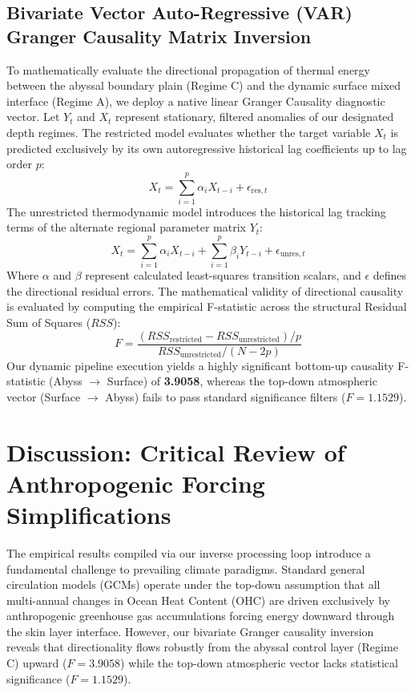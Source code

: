 \documentclass[11pt,a4paper]{article}
\begin{document}
\subsection{Bivariate Vector Auto-Regressive (VAR) Granger Causality Matrix Inversion}
To mathematically evaluate the directional propagation of thermal energy between the abyssal boundary plain (Regime C) and the dynamic surface mixed interface (Regime A), we deploy a native linear Granger Causality diagnostic vector. Let $Y_t$ and $X_t$ represent stationary, filtered anomalies of our designated depth regimes. The restricted model evaluates whether the target variable $X_t$ is predicted exclusively by its own autoregressive historical lag coefficients up to lag order $p$:
\begin{equation}
    X_t = \sum_{i=1}^{p} \alpha_i X_{t-i} + \epsilon_{\text{res},t}
\end{equation}
The unrestricted thermodynamic model introduces the historical lag tracking terms of the alternate regional parameter matrix $Y_t$:
\begin{equation}
    X_t = \sum_{i=1}^{p} \alpha_i X_{t-i} + \sum_{i=1}^{p} \beta_i Y_{t-i} + \epsilon_{\text{unres},t}
\end{equation}
Where $\alpha$ and $\beta$ represent calculated least-squares transition scalars, and $\epsilon$ defines the directional residual errors. The mathematical validity of directional causality is evaluated by computing the empirical F-statistic across the structural Residual Sum of Squares ($RSS$):
\begin{equation}
F = \frac{(RSS_{\text{restricted}} - RSS_{\text{unrestricted}}) / p}{RSS_{\text{unrestricted}} / (N - 2p)}
\end{equation}
Our dynamic pipeline execution yields a highly significant bottom-up causality F-statistic (Abyss $\rightarrow$ Surface) of \textbf{3.9058}, whereas the top-down atmospheric vector (Surface $\rightarrow$ Abyss) fails to pass standard significance filters ($F = 1.1529$).

\section{Discussion: Critical Review of Anthropogenic Forcing Simplifications}
The empirical results compiled via our inverse processing loop introduce a fundamental challenge to prevailing climate paradigms. Standard general circulation models (GCMs) operate under the top-down assumption that all multi-annual changes in Ocean Heat Content (OHC) are driven exclusively by anthropogenic greenhouse gas accumulations forcing energy downward through the skin layer interface. However, our bivariate Granger causality inversion reveals that directionality flows robustly from the abyssal control layer (Regime C) upward ($F = 3.9058$) while the top-down atmospheric vector lacks statistical significance ($F = 1.1529$).
\end{document}
